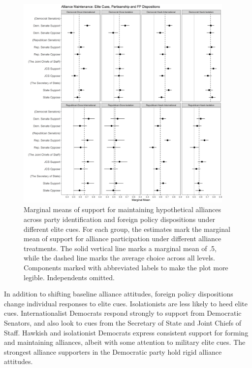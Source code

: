 \documentclass[12pt]{article}
\begin{document}
\begin{figure}
	\centering
		\includegraphics[width=0.95\textwidth]{../figures/party-dispo-main-el.png}
	\caption{Marginal means of support for maintaining hypothetical alliances across party identification and foreign policy dispositions under different elite cues. For each group, the estimates mark the marginal mean of support for alliance participation under different alliance treatments. The solid vertical line marks a marginal mean of .5, while the dashed line marks the average choice across all levels. Components marked with abbreviated labels to make the plot more legible. Independents omitted.}
	\label{fig:party-dispo-main-el}
\end{figure}


In addition to shifting baseline alliance attitudes, foreign policy dispositions change individual responses to elite cues. 
Isolationists are less likely to heed elite cues. 
Internationalist Democrats respond strongly to support from Democratic Senators, and also look to cues from the Secretary of State and Joint Chiefs of Staff. 
Hawkish and isolationist Democrats express consistent support for forming and maintaining alliances, albeit with some attention to military elite cues. 
The strongest alliance supporters in the Democratic party hold rigid alliance attitudes.
\end{document}
